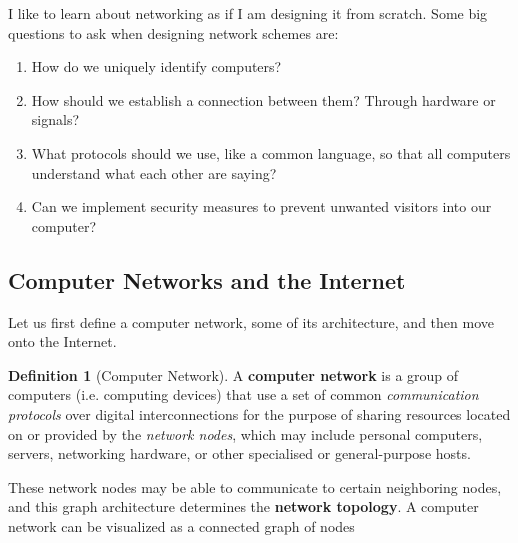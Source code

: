 \documentclass{article}
\theoremstyle{definition}
\newtheorem{definition}{Definition}[section]
\begin{document}
  I like to learn about networking as if I am designing it from scratch. Some big questions to ask when designing network schemes are:

  \begin{enumerate}
    \item How do we uniquely identify computers? 
    \item How should we establish a connection between them? Through hardware or signals? 
    \item What protocols should we use, like a common language, so that all computers understand what each other are saying? 
    \item Can we implement security measures to prevent unwanted visitors into our computer? 
  \end{enumerate} 

  \subsection{Computer Networks and the Internet}

    Let us first define a computer network, some of its architecture, and then move onto the Internet. 

    \begin{definition}[Computer Network]
      A \textbf{computer network} is a group of computers (i.e. computing devices) that use a set of common \textit{communication protocols} over digital interconnections for the purpose of sharing resources located on or provided by the \textit{network nodes}, which may include personal computers, servers, networking hardware, or other specialised or general-purpose hosts. 

    \end{definition}

    These network nodes may be able to communicate to certain neighboring nodes, and this graph architecture determines the \textbf{network topology}. A computer network can be visualized as a connected graph of nodes 
\end{document}
